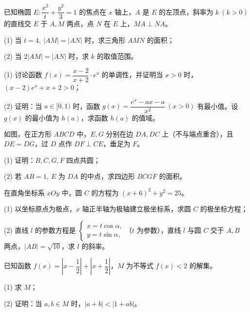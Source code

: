 \begin{question}
已知椭圆 \(E:\dfrac{x^2}{t}+\dfrac{y^2}{3}=1\) 的焦点在 \(x\) 轴上，\(A\) 是 \(E\) 的左顶点，斜率为 \(k\ (k>0)\) 的直线交 \(E\) 于 \(A,M\) 两点，点 \(N\) 在 \(E\) 上，\(MA\perp NA\)。

   (1) 当 \(t=4,\ |AM|=|AN|\) 时，求三角形 \(AMN\) 的面积；

   (2) 当 \(2|AM|=|AN|\) 时，求 \(k\) 的取值范围。

\end{question}
\begin{question}
(1) 讨论函数 \(f(x)=\dfrac{x-2}{x+2}\cdot e^x\) 的单调性，并证明当 \(x>0\) 时，\((x-2)e^x+x+2>0\)；

   (2) 证明：当 \(a\in[0,1)\) 时，函数 \(g(x)=\dfrac{e^x-ax-a}{x^2}\ (x>0)\) 有最小值。设 \(g(x)\) 的最小值为 \(h(a)\)，求函数 \(h(a)\) 的值域。

\Needspace{0.4\textheight}
\end{question}
\begin{question}
如图，在正方形 \(ABCD\) 中，\(E,G\) 分别在边 \(DA,DC\) 上（不与端点重合），且 \(DE=DG\)，过 \(D\) 点作 \(DF\perp CE\)，垂足为 \(F\)。
\nopagebreak[4]
\begin{center}\end{center}
\nopagebreak[4]
   (1) 证明：\(B,C,G,F\) 四点共圆；

   (2) 若 \(AB=1,\ E\) 为 \(DA\) 的中点，求四边形 \(BCGF\) 的面积。

\end{question}
\begin{question}
在直角坐标系 \(xOy\) 中，圆 \(C\) 的方程为 \((x+6)^2+y^2=25\)。

   (1) 以坐标原点为极点，\(x\) 轴正半轴为极轴建立极坐标系，求圆 \(C\) 的极坐标方程；

   (2) 直线 \(l\) 的参数方程是 \(\begin{cases}x=t\cos\alpha,\\y=t\sin\alpha,\end{cases}\)（\(t\) 为参数），直线 \(l\) 与圆 \(C\) 交于 \(A,B\) 两点，\(|AB|=\sqrt{10}\)，求 \(l\) 的斜率。

\end{question}
\begin{question}
已知函数 \(f(x)=\left|x-\dfrac12\right|+\left|x+\dfrac12\right|\)，\(M\) 为不等式 \(f(x)<2\) 的解集。

   (1) 求 \(M\)；

   (2) 证明：当 \(a,b\in M\) 时，\(|a+b|<|1+ab|\)。

\end{question}